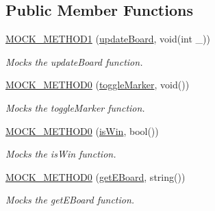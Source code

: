 \subsection*{Public Member Functions}
\begin{DoxyCompactItemize}
\item 
\mbox{\label{classMockBoard_a57e597fcd77beb5515b790ccd7fef046}} 
\mbox{\hyperlink{classMockBoard_a57e597fcd77beb5515b790ccd7fef046}{M\+O\+C\+K\+\_\+\+M\+E\+T\+H\+O\+D1}} (\mbox{\hyperlink{classBoard_a44d5f45daeec9a19d48d17aa02601a17}{update\+Board}}, void(int \+\_\+))
\begin{DoxyCompactList}\small\item\em Mocks the update\+Board function. \end{DoxyCompactList}\item 
\mbox{\label{classMockBoard_a85d4ebc748750df580b2fc9d8923cac3}} 
\mbox{\hyperlink{classMockBoard_a85d4ebc748750df580b2fc9d8923cac3}{M\+O\+C\+K\+\_\+\+M\+E\+T\+H\+O\+D0}} (\mbox{\hyperlink{classBoard_aca803d96c721292cedaf21b2ac5fb1a8}{toggle\+Marker}}, void())
\begin{DoxyCompactList}\small\item\em Mocks the toggle\+Marker function. \end{DoxyCompactList}\item 
\mbox{\label{classMockBoard_a0d0da2723c80205f275e1c9bd2225cc6}} 
\mbox{\hyperlink{classMockBoard_a0d0da2723c80205f275e1c9bd2225cc6}{M\+O\+C\+K\+\_\+\+M\+E\+T\+H\+O\+D0}} (\mbox{\hyperlink{classBoard_ae59ed3d0322d92f9d9ae3ee6652e7268}{is\+Win}}, bool())
\begin{DoxyCompactList}\small\item\em Mocks the is\+Win function. \end{DoxyCompactList}\item 
\mbox{\label{classMockBoard_ad2b162d253cfd9efbca2ad7cdb810111}} 
\mbox{\hyperlink{classMockBoard_ad2b162d253cfd9efbca2ad7cdb810111}{M\+O\+C\+K\+\_\+\+M\+E\+T\+H\+O\+D0}} (\mbox{\hyperlink{classBoard_a3707ab499357d887c1be4e2bbb477891}{get\+E\+Board}}, string())
\begin{DoxyCompactList}\small\item\em Mocks the get\+E\+Board function. \end{DoxyCompactList}\end{DoxyCompactItemize}
